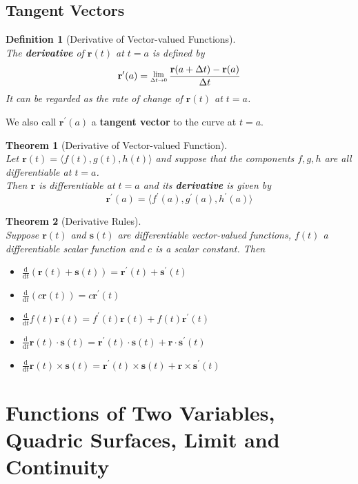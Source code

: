 \documentclass[12pt]{article}
\newcommand{\Lim}[1]{\raisebox{0.5ex}{\scalebox{0.8}{$\displaystyle \lim_{#1}\;$}}}
\newtheorem{definition}{Definition}[section]
\newtheorem{theorem}{Theorem}[section]
\theoremstyle{definition}
\newcommand{\diff}{\mathrm{d}}
\newcommand\ve[1]{\mathbf{#1}}
\begin{document}
\subsection{Tangent Vectors}
\begin{definition}[Derivative of Vector-valued Functions]
\hfill\\\normalfont The \textbf{derivative} of $\ve{r}(t)$ at $t=a$ is defined by
\[
\ve{r}^\prime(a)=\Lim{\Delta t\to 0}\frac{\ve{r}(a+\Delta t)-\ve{r}(a)}{\Delta t}
\]
It can be regarded as the rate of change of $\ve{r}(t)$ at $t = a$.
\end{definition}
We also call $\ve{r}^\prime (a)$ a \textbf{tangent vector} to the curve at $t= a$.
\begin{theorem}[Derivative of Vector-valued Function]
\hfill\\\normalfont Let $\ve{r}(t) = \langle f(t),g(t),h(t)\rangle$ and suppose that the components $f,g,h$ are all differentiable at $t = a$.\\
Then $\ve{r}$ is differentiable at $t= a$ and its \textbf{derivative} is given by
\[
\ve{r}^\prime(a)= \langle f^\prime(a),g^\prime(a),h^\prime(a)\rangle
\]
\end{theorem}
\begin{theorem}[Derivative Rules]
\hfill\\\normalfont Suppose $\ve{r}(t)$ and $\ve{s}(t)$ are differentiable vector-valued functions, $f(t)$ a differentiable scalar function and $c$ is a scalar constant. Then
\begin{itemize}
  \item $\frac{\diff}{\diff t}(\ve{r}(t)+\ve{s}(t))=\ve{r}^\prime(t)+\ve{s}^\prime(t)$
  \item $\frac{\diff}{\diff t}(c\ve{r}(t))=c\ve{r}^\prime(t)$
  \item $\frac{\diff}{\diff t}f(t)\ve{r}(t)=f^\prime (t)\ve{r}(t)+f(t)\ve{r}^\prime (t)$
  \item $\frac{\diff}{\diff t}\ve{r}(t)\cdot\ve{s}(t)=\ve{r}^\prime(t)\cdot\ve{s}(t)+\ve{r}\cdot\ve{s}^\prime(t)$
  \item$\frac{\diff}{\diff t}\ve{r}(t)\times\ve{s}(t)=\ve{r}^\prime(t)\times\ve{s}(t)+\ve{r}\times\ve{s}^\prime(t)$
\end{itemize}
\end{theorem}
\clearpage
\section{Functions of Two Variables, Quadric Surfaces, Limit and Continuity}
\end{document}
